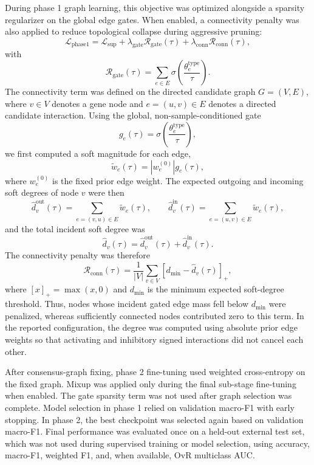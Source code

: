 \documentclass[unnumsec,webpdf,modern,large]{oup-authoring-template}
\begin{document}
During phase 1 graph learning, this objective was optimized alongside a sparsity regularizer on the global edge gates. When enabled, a connectivity penalty was also applied to reduce topological collapse during aggressive pruning:
\[
\mathcal{L}_{\mathrm{phase1}}
=
\mathcal{L}_{\mathrm{sup}}
+
\lambda_{\mathrm{gate}}\mathcal{R}_{\mathrm{gate}}(\tau)
+
\lambda_{\mathrm{conn}}\mathcal{R}_{\mathrm{conn}}(\tau),
\]
with
\[
\mathcal{R}_{\mathrm{gate}}(\tau)=\sum_{e\in E}\sigma\!\left(\frac{\theta_e^{\mathrm{type}}}{\tau}\right).
\]
The connectivity term was defined on the directed candidate graph \(G=(V,E)\), where \(v\in V\) denotes a gene node and \(e=(u,v)\in E\) denotes a directed candidate interaction. Using the global, non-sample-conditioned gate
\[
g_e(\tau)=\sigma\!\left(\frac{\theta_e^{\mathrm{type}}}{\tau}\right),
\]
we first computed a soft magnitude for each edge,
\[
\tilde w_e(\tau)=\left|w_e^{(0)}\right|g_e(\tau),
\]
where \(w_e^{(0)}\) is the fixed prior edge weight. The expected outgoing and incoming soft degrees of node \(v\) were then
\[
\hat d_v^{\mathrm{out}}(\tau)=\sum_{e=(v,u)\in E}\tilde w_e(\tau),
\qquad
\hat d_v^{\mathrm{in}}(\tau)=\sum_{e=(u,v)\in E}\tilde w_e(\tau),
\]
and the total incident soft degree was
\[
\hat d_v(\tau)=\hat d_v^{\mathrm{out}}(\tau)+\hat d_v^{\mathrm{in}}(\tau).
\]
The connectivity penalty was therefore
\[
\mathcal{R}_{\mathrm{conn}}(\tau)=
\frac{1}{|V|}\sum_{v\in V}\left[d_{\min}-\hat d_v(\tau)\right]_+,
\]
where \([x]_+=\max(x,0)\) and \(d_{\min}\) is the minimum expected soft-degree threshold. Thus, nodes whose incident gated edge mass fell below \(d_{\min}\) were penalized, whereas sufficiently connected nodes contributed zero to this term. In the reported configuration, the degree was computed using absolute prior edge weights so that activating and inhibitory signed interactions did not cancel each other.

After consensus-graph fixing, phase 2 fine-tuning used weighted cross-entropy on the fixed graph. Mixup was applied only during the final sub-stage fine-tuning when enabled. The gate sparsity term was not used after graph selection was complete. Model selection in phase 1 relied on validation macro-F1 with early stopping. In phase 2, the best checkpoint was selected again based on validation macro-F1. Final performance was evaluated once on a held-out external test set, which was not used during supervised training or model selection, using accuracy, macro-F1, weighted F1, and, when available, OvR multiclass AUC. 
\end{document}
